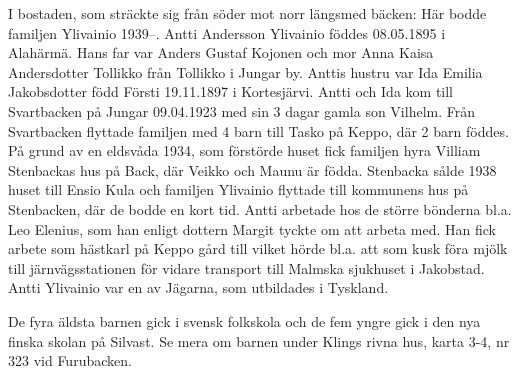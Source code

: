 I bostaden, som sträckte sig från söder mot norr längsmed bäcken:
Här bodde	familjen Ylivainio 1939--. Antti Andersson Ylivainio föddes 08.05.1895 i Alahärmä. Hans far var Anders Gustaf Kojonen och mor Anna Kaisa Andersdotter Tollikko från Tollikko i Jungar by. Anttis hustru var Ida Emilia Jakobsdotter född Försti 19.11.1897 i Kortesjärvi. Antti och Ida kom till Svartbacken på Jungar 09.04.1923 med sin 3 	dagar gamla son Vilhelm. Från Svartbacken flyttade familjen med 4	barn till Tasko på Keppo, där 2 barn föddes. På grund av en eldsvåda 1934, som förstörde huset fick familjen hyra Villiam Stenbackas hus på	Back, där Veikko och Maunu är födda. Stenbacka sålde 1938 huset till Ensio Kula och familjen Ylivainio flyttade till kommunens hus på Stenbacken, där de bodde en kort tid. Antti arbetade hos de större 	bönderna bl.a. Leo Elenius, som han enligt dottern Margit tyckte om att arbeta med. Han fick arbete som hästkarl på Keppo gård till vilket hörde bl.a. att som kusk föra mjölk till järnvägsstationen för vidare transport till Malmska sjukhuset i Jakobstad. Antti Ylivainio var en av Jägarna, som utbildades i Tyskland.
\begin{jhchildren}
  \item {}
  \item {}
  \item {}
  \item {}
  \item {}
  \item {}
  \item {}
  \item {}
  \item {}
\end{jhchildren}
De fyra äldsta barnen gick i svensk folkskola och de fem yngre gick i den nya finska skolan på Silvast. Se mera om barnen under Klings rivna hus,	karta 3-4, nr 323 vid Furubacken.

